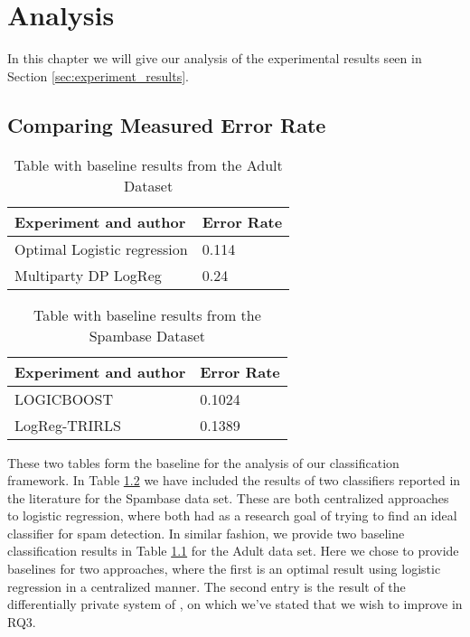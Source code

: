 
\chapter{Analysis}
\label{ch:analysis}
In this chapter we will give our analysis of the experimental results seen in Section \ref{sec:experiment_results}.

\section{Comparing Measured Error Rate}

\begin{table}[h]
	\begin{tabularx}{\textwidth}{|X|l|}
		\textbf{Experiment and author}                                                 & \textbf{Error Rate}      \\
				\hline
		Optimal Logistic regression \citep{caruana2006empirical}   				       & 0.114 \\
		Multiparty DP LogReg \citep{pathak2010diffprivhomo}                            & 0.24 \\
	\end{tabularx}
	\caption{Table with baseline results from the Adult Dataset}
	\label{tab:baseline_class_results_adult}
\end{table}
\begin{table}[h]
	\begin{tabularx}{\textwidth}{|X|l|}
		\textbf{Experiment and author}                                             & \textbf{Error Rate}      \\
		\hline
		LOGICBOOST\citep{sharma2013adaptive}                                       & 0.1024 \\
		LogReg-TRIRLS\citep{kumar2012comparative}                                  & 0.1389 \\
	\end{tabularx}
	\caption{Table with baseline results from the Spambase Dataset}
	\label{tab:baseline_class_results_spambase}
\end{table}

These two tables form the baseline for the analysis of our classification framework. In Table \ref{tab:baseline_class_results_spambase} we have included the results of two classifiers reported in the literature \citep{sharma2013adaptive,kumar2012comparative} for the Spambase data set. These are both centralized approaches to logistic regression, where both had as a research goal of trying to find an ideal classifier for spam detection. In similar fashion, we provide two baseline classification results in Table \ref{tab:baseline_class_results_adult} for the Adult data set. Here we chose to provide baselines for two approaches, where the first \citep{caruana2006empirical} is an optimal result using logistic regression in a centralized manner. The second entry is the result of the differentially private system of \cite{pathak2010diffprivhomo}, on which we've stated that we wish to improve in RQ3.

